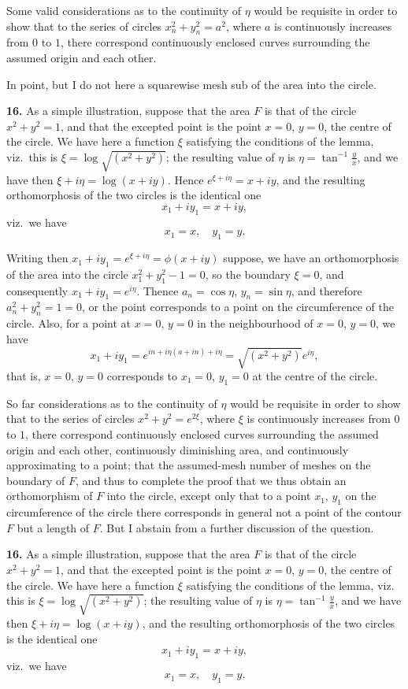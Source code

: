 \documentclass[11pt,a4paper]{book}
\begin{document}
Some valid considerations as to the continuity of $\eta$ would be requisite in order to show that to the series of circles $x_n^2 + y_n^2 = a^2$, where $a$ is continuously increases from $0$ to $1$, there correspond continuously enclosed curves surrounding the assumed origin and each other.

In point, but I do not here a squarewise mesh sub of the area into the circle.

\textbf{16.} As a simple illustration, suppose that the area $F$ is that of the circle $x^2 + y^2 = 1$, and that the excepted point is the point $x = 0$, $y = 0$, the centre of the circle. We have here a function $\xi$ satisfying the conditions of the lemma, viz.\ this is $\xi = \log \sqrt{(x^2 + y^2)}$; the resulting value of $\eta$ is $\eta = \tan^{-1}\frac{y}{x}$, and we have then $\xi + i \eta = \log (x + iy)$. Hence $e^{\xi + i \eta} = x + iy$, and the resulting orthomorphosis of the two circles is the identical one
\[
x_1 + iy_1 = x + iy,
\]
viz.\ we have
\[
x_1 = x, \quad y_1 = y.
\]

Writing then $x_1 + iy_1 = e^{\xi + i \eta} = \phi(x + iy)$ suppose, we have an orthomorphosis of the area into the circle $x_1^2 + y_1^2 - 1 = 0$, so the boundary $\xi = 0$, and consequently $x_1 + i y_1 = e^{i\eta}$. Thence $a_n = \cos \eta$, $y_n = \sin \eta$, and therefore $a_n^2 + y_n^2 = 1 = 0$, or the point corresponds to a point on the circumference of the circle. Also, for a point at $x = 0$, $y = 0$ in the neighbourhood of $x = 0$, $y = 0$, we have
\[
x_1 + i y_1 = e^{i n + i \eta(a + i n) + i \eta} = \sqrt{(x^2 + y^2)} e^{i\eta},
\]
that is, $x = 0$, $y = 0$ corresponds to $x_1 = 0$, $y_1 = 0$ at the centre of the circle.

So far considerations as to the continuity of $\eta$ would be requisite in order to show that to the series of circles $x^2 + y^2 = e^{2\xi}$, where $\xi$ is continuously increases from $0$ to $1$, there correspond continuously enclosed curves surrounding the assumed origin and each other, continuously diminishing area, and continuously approximating to a point; that the assumed-mesh number of meshes on the boundary of $F$, and thus to complete the proof that we thus obtain an orthomorphism of $F$ into the circle, except only that to a point $x_1$, $y_1$ on the circumference of the circle there corresponds in general not a point of the contour $F$ but a length of $F$. But I abstain from a further discussion of the question.

\textbf{16.} As a simple illustration, suppose that the area $F$ is that of the circle $x^2 + y^2 = 1$, and that the excepted point is the point $x = 0$, $y = 0$, the centre of the circle. We have here a function $\xi$ satisfying the conditions of the lemma, viz. this is $\xi = \log \sqrt{(x^2 + y^2)}$; the resulting value of $\eta$ is $\eta = \tan^{-1}\frac{y}{x}$, and we have then $\xi + i\eta = \log (x + iy)$, and the resulting orthomorphosis of the two circles is the identical one
\[
x_1 + iy_1 = x + iy,
\]
viz.\ we have
\[
x_1 = x, \quad y_1 = y.
\]
\end{document}
